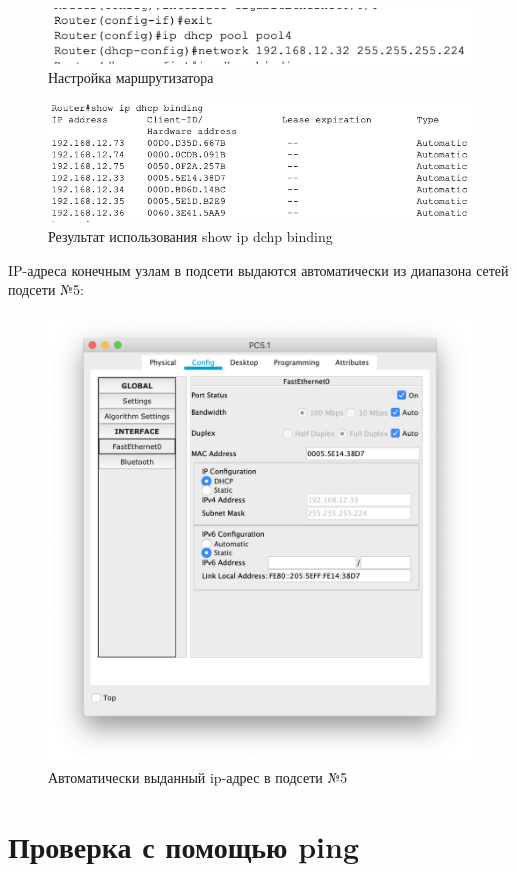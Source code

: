 \begin{figure}[H]
    \centering
    \includegraphics[width=0.8\linewidth]{images/net_5.png}
    \caption{Настройка маршрутизатора}%
\end{figure}

\begin{figure}[H]
    \centering
    \includegraphics[width=0.8\linewidth]{images/net_4_5.png}
    \caption{Результат использования show ip dchp binding}%
\end{figure}

IP-адреса конечным узлам в подсети выдаются автоматически из диапазона сетей подсети №5:

\begin{figure}[H]
    \centering
    \includegraphics[width=0.7\linewidth]{images/net_5_machine.png}
    \caption{Автоматически выданный ip-адрес в подсети №5}%
\end{figure}

\chapter{Проверка с помощью ping}%
\label{cha:vyvod}

